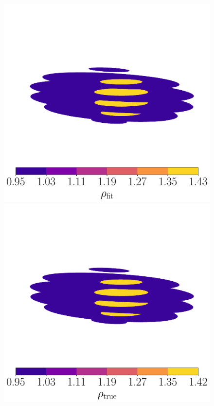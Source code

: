 \documentclass[fleqn,usenatbib]{mnras}
\begin{document}
\begin{figure}
  \centering
  \includegraphics[width=0.49\linewidth]{figs/side-by-side-d}\hfill
  \includegraphics[width=0.49\linewidth]{figs/side-by-side-t}


\end{figure}
\end{document}
